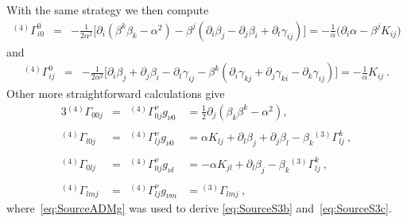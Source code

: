\documentclass{article}
\begin{document}
%
With the same strategy we then compute
%
\begin{eqnarray}
  \label{eq:SourceChr1a}
  {}^{(4)}\Gamma^0_{i0} & = & - \frac{1}{2\alpha^2} \Big[
      \partial_i (\beta^k \beta_k - \alpha^2) - \beta^j (\partial_i
      \beta_j - \partial_j \beta_i + \partial_t \gamma_{ij}) \Big] = - \frac{1}{\alpha} \Big(\partial_i\alpha - \beta^j K_{ij}\Big)
\end{eqnarray}
%
and
%
\begin{eqnarray}
\label{eq:SourceChr0ij}
  {}^{(4)}\Gamma^0_{ij} & = & - \frac{1}{2\alpha^2} \Big[
      \partial_i\beta_j + \partial_j\beta_i - \partial_t\gamma_{ij} - \beta^k
  (\partial_i\gamma_{kj} + \partial_j\gamma_{ki} - \partial_k\gamma_{ij})\Big] = -
  \frac{1}{\alpha} K_{ij}\ .
\end{eqnarray}
%
Other more straightforward calculations give
%
\begin{alignat}{3}
  \label{eq:SourceS3a}
  {}^{(4)}\Gamma_{00j} &=& {}^{(4)}\Gamma^\nu_{0j}g_{\nu 0} & =  \frac{1}{2} \partial_j \left( \beta_k
    \beta^k - \alpha^2 \right), \\
\nonumber\\
  \label{eq:SourceS3b}
  {}^{(4)}\Gamma_{l0j} &=& {}^{(4)}\Gamma^\nu_{lj}g_{\nu 0} & =  \alpha K_{lj} + \partial_l\beta_j + \partial_j\beta_l - \beta_k{}^{(3)}\Gamma^k_{lj}\ , \\
\nonumber\\
  \label{eq:SourceS3c}
  {}^{(4)}\Gamma_{0lj} &=& {}^{(4)}\Gamma^\nu_{0j}g_{\nu l} & =  -\alpha K_{jl} + \partial_l\beta_j - \beta_k {}^{(3)}\Gamma^k_{lj}\ , \\
\nonumber\\
  \label{eq:SourceS3d}
  {}^{(4)}\Gamma_{lmj} &=& {}^{(4)}\Gamma^\nu_{lj}g_{\nu m} & =  {}^{(3)}\Gamma_{lmj}\ ,
\end{alignat}
%
where~\eqref{eq:SourceADMg} was used to derive \eqref{eq:SourceS3b}
and~\eqref{eq:SourceS3c}.
\end{document}

